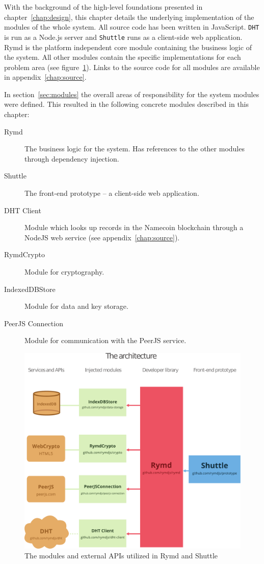 With the background of the high-level foundations presented in chapter~\ref{chap:design}, this chapter details the underlying implementation of the modules of the whole system. All source code has been written in JavaScript. \texttt{DHT} is run as a Node.js server and \texttt{Shuttle} runs as a client-side web application. Rymd is the platform independent core module containing the business logic of the system. All other modules contain the specific implementations for each problem area (see figure~\ref{fig:architecture}). Links to the source code for all modules are available in appendix~\ref{chap:source}.

In section~\ref{sec:modules} the overall areas of responsibility for the system modules were defined. This resulted in the following concrete modules described in this chapter:

\begin{description}
  \item[Rymd] The business logic for the system. Has references to the other modules through dependency injection.
  \item[Shuttle] The front-end prototype – a client-side web application.
  \item[DHT Client] Module which looks up records in the Namecoin blockchain through a NodeJS web service (see appendix~\ref{chap:source}).
  \item[RymdCrypto] Module for cryptography.
  \item[IndexedDBStore] Module for data and key storage.
  \item[PeerJS Connection] Module for communication with the PeerJS service.
\end{description}

\begin{figure}[ht]
\centering
\includegraphics[width=\textwidth,height=0.4\paperheight,keepaspectratio
]{figures/architecture}
\caption{The modules and external APIs utilized in Rymd and Shuttle}
\label{fig:architecture}
\end{figure}

